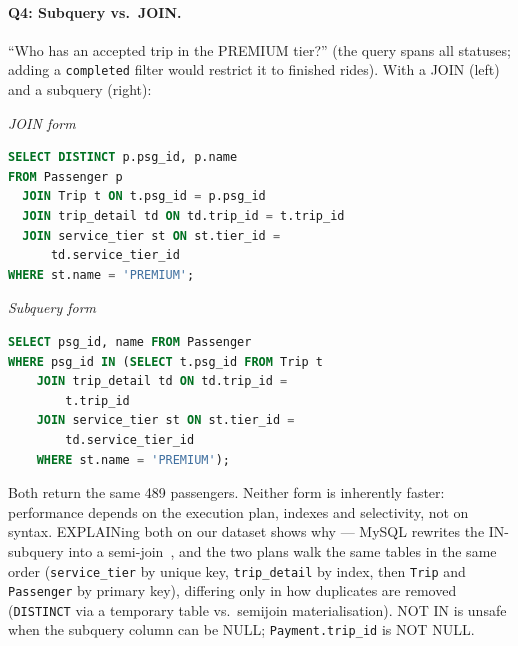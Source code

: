 \paragraph{Q4: Subquery vs.\ JOIN.}
``Who has an accepted trip in the PREMIUM tier?'' (the query spans all statuses; adding a \texttt{completed} filter would restrict it to finished rides). With a JOIN (left) and a subquery (right):

\noindent
\begin{minipage}{\textwidth}
\begin{minipage}[t]{0.487\textwidth}
\centering\small\itshape JOIN form
\begin{lstlisting}[language=SQL,numbers=none]
SELECT DISTINCT p.psg_id, p.name
FROM Passenger p
  JOIN Trip t ON t.psg_id = p.psg_id
  JOIN trip_detail td ON td.trip_id = t.trip_id
  JOIN service_tier st ON st.tier_id =
      td.service_tier_id
WHERE st.name = 'PREMIUM';
\end{lstlisting}
\end{minipage}\hfill
\begin{minipage}[t]{0.487\textwidth}
\centering\small\itshape Subquery form
\begin{lstlisting}[language=SQL,numbers=none]
SELECT psg_id, name FROM Passenger
WHERE psg_id IN (SELECT t.psg_id FROM Trip t
    JOIN trip_detail td ON td.trip_id =
        t.trip_id
    JOIN service_tier st ON st.tier_id =
        td.service_tier_id
    WHERE st.name = 'PREMIUM');
\end{lstlisting}
\end{minipage}
\end{minipage}
Both return the same 489 passengers. Neither form is inherently faster: performance depends on the execution plan, indexes and selectivity, not on syntax. EXPLAINing both on our dataset shows why --- MySQL rewrites the IN-subquery into a semi-join~\cite{mysql80}, and the two plans walk the same tables in the same order (\texttt{service\_tier} by unique key, \texttt{trip\_detail} by index, then \texttt{Trip} and \texttt{Passenger} by primary key), differing only in how duplicates are removed (\texttt{DISTINCT} via a temporary table vs.\ semijoin materialisation). NOT IN is unsafe when the subquery column can be NULL; \texttt{Payment.trip\_id} is NOT NULL.

